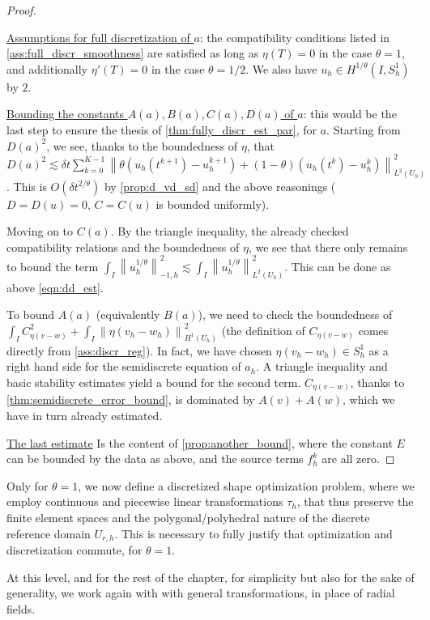 \documentclass[english,a4paper,9pt,oneside]{scrbook}	%
\theoremstyle{break}
\newenvironment{mproof}[1][\proofname]{%
  \begin{proof}[#1]$ $\par\nobreak\ignorespaces
}{%
  \end{proof}
}
\renewcommand*{\proofname}{Proof}
\theoremstyle{remark}
\newcommand{\ds}{\displaystyle}
\newcommand{\norm}[1]{\left\lVert#1\right\rVert}
\newcommand{\te}{\theta}
\begin{document}
\begin{mproof}
\underline{Assumptions for full discretization of $a$}: the compatibility conditions listed in \cref{ass:full_discr_smoothness} are satisfied as long as $\eta(T)=0$ in the case $\theta = 1$, and additionally $\eta'(T)=0$ in the case $\theta=1/2$. We also have $u_h \in H^{1/\theta}(I,S^1_h)$ by $2$.

\underline{Bounding the constants $A(a),B(a),C(a),D(a)$ of $a$}: this would be the last step to ensure the thesis of \cref{thm:fully_discr_est_par}, for $a$. Starting from $D(a)^2$, we see, thanks to the boundedness of $\eta$, that $D(a)^2 \lesssim \delta t \sum_{k=0}^{K-1}\norm{\theta(u_h(t^{k+1})-u_h^{k+1}) + (1-\theta)(u_h(t^k)-u_h^k)}^2_{L^2(U_h)}$. This is $O(\delta t^{2/\theta})$ by \cref{prop:d_vd_sd} and the above reasonings ($D=D(u)=0$, $C=C(u)$ is bounded uniformly).

Moving on to $C(a)$. By the triangle inequality, the already checked compatibility relations and the boundedness of $\eta$, we see that there only remains to bound  the term $\ds \int_I\norm{u_h^{1/\theta}}_{-1,h}^2\lesssim \int_I\norm{u_h^{1/\theta}}_{L^2(U_h)}^2$. This can be done as above \cref{eqn:dd_est}.

To bound $A(a)$ (equivalently $B(a)$), we need to check the boundedness of $\ds \int_I C_{\eta(v-w)}^2 + \int_I \norm{\eta(v_h - w_h)}_{H^1(U_h)}^2$ (the definition of $C_{\eta(v-w)}$ comes directly from \cref{ass:discr_reg}). In fact, we have chosen $\eta(v_h - w_h) \in S^1_h$ as a right hand side for the semidiscrete equation of $a_h$. A triangle inequality and basic stability estimates yield a bound for the second term. $C_{\eta(v-w)}$, thanks to \cref{thm:semidiscrete_error_bound}, is dominated by $A(v)+A(w)$, which we have in turn already estimated.

\underline{The last estimate}
Is the content of \cref{prop:another_bound}, where the constant $E$ can be bounded by the data as above, and the source terms $f_h^k$ are all zero.
\end{mproof}


Only for $\te = 1$, we now define a discretized shape optimization problem, where we employ continuous and piecewise linear transformations $\tau_h$, that thus preserve the finite element spaces and the polygonal/polyhedral nature of the discrete reference domain $U_{r,h}$. This is necessary to fully justify that optimization and discretization commute, for $\theta=1$.  

At this level, and for the rest of the chapter, for simplicity but also for the sake of generality, we work again with with general transformations, in place of radial fields.
\end{document}
